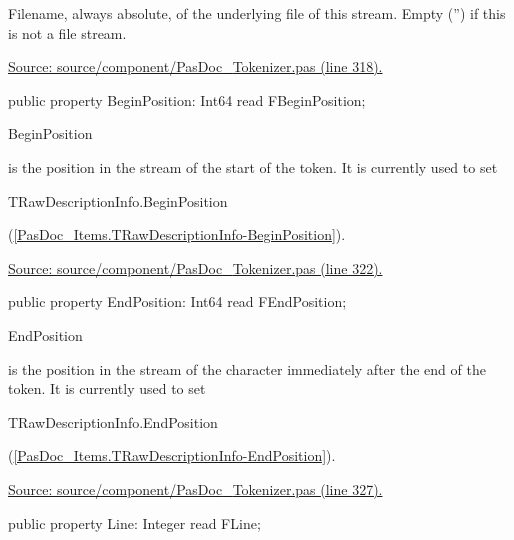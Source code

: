 \documentclass{report}
\newif\ifpdf
\begin{document}
\begin{list}{}
\begin{flushleft}
\ifpdf
\end{flushleft}
\fi


\par Filename, always absolute, of the underlying file of this stream. Empty ('') if this is not a file stream.\par
\href{https://github.com/pasdoc/pasdoc/blob/master/source/component/PasDoc_Tokenizer.pas#L318}{Source: source/component/PasDoc{\_}Tokenizer.pas (line 318).}\label{PasDoc_Tokenizer.TToken-BeginPosition}
\item[\textbf{BeginPosition}\hfill]
\ifpdf
\begin{flushleft}
\fi
\begin{ttfamily}
public property BeginPosition: Int64 read FBeginPosition;\end{ttfamily}

\ifpdf
\end{flushleft}
\fi


\par \begin{ttfamily}BeginPosition\end{ttfamily} is the position in the stream of the start of the token. It is currently used to set \begin{ttfamily}TRawDescriptionInfo.BeginPosition\end{ttfamily}(\ref{PasDoc_Items.TRawDescriptionInfo-BeginPosition}).\par
\href{https://github.com/pasdoc/pasdoc/blob/master/source/component/PasDoc_Tokenizer.pas#L322}{Source: source/component/PasDoc{\_}Tokenizer.pas (line 322).}\label{PasDoc_Tokenizer.TToken-EndPosition}
\item[\textbf{EndPosition}\hfill]
\ifpdf
\begin{flushleft}
\fi
\begin{ttfamily}
public property EndPosition: Int64 read FEndPosition;\end{ttfamily}

\ifpdf
\end{flushleft}
\fi


\par \begin{ttfamily}EndPosition\end{ttfamily} is the position in the stream of the character immediately after the end of the token. It is currently used to set \begin{ttfamily}TRawDescriptionInfo.EndPosition\end{ttfamily}(\ref{PasDoc_Items.TRawDescriptionInfo-EndPosition}).\par
\href{https://github.com/pasdoc/pasdoc/blob/master/source/component/PasDoc_Tokenizer.pas#L327}{Source: source/component/PasDoc{\_}Tokenizer.pas (line 327).}\label{PasDoc_Tokenizer.TToken-Line}
\item[\textbf{Line}\hfill]
\ifpdf
\begin{flushleft}
\fi
\begin{ttfamily}
public property Line: Integer read FLine;\end{ttfamily}


\end{flushleft}
\end{list}
\end{document}
